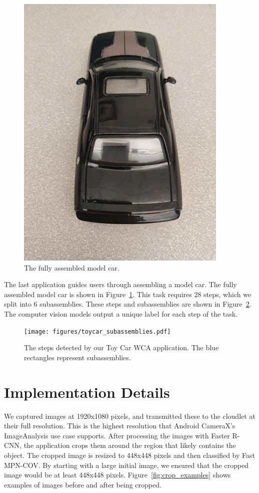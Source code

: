 \begin{figure}
  \includegraphics{figures/full_toycar.jpg}
  \caption{
    The fully assembled model car.
  }\label{fig:full_toycar}
\end{figure}

The last application guides users through assembling a model car.
The fully assembled model car is shown in Figure~\ref{fig:full_toycar}.
This task requires 28 steps, which we split into 6 subassemblies.
These steps and subassemblies are shown in Figure~\ref{fig:toy_car}.
The computer vision models output a unique label for each step of the task.

\begin{figure}
  \texttt{[image: figures/toycar\_subassemblies.pdf]}
  \caption{
    The steps detected by our Toy Car WCA application.
    The blue rectangles represent subassemblies.
  }\label{fig:toy_car}
\end{figure}

\section{Implementation Details}\label{sec:implementation_details}

We captured images at 1920x1080 pixels, and transmitted these to the cloudlet at
their full resolution.
This is the highest resolution that Android CameraX's ImageAnalysis use case
supports.
After processing the images with Faster R-CNN, the application crops them around
the region that likely contains the object.
The cropped image is resized to 448x448 pixels and then classified by Fast
MPN-COV.
By starting with a large initial image, we ensured that the cropped image would
be at least 448x448 pixels.
Figure~\ref{fig:crop_examples} shows examples of images before and after being
cropped.

